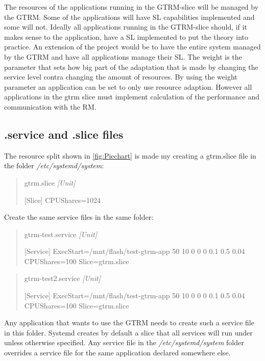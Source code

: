 \documentclass[nobiblatex]{LTHthesis}
\begin{document}
The resources of the applications running in the GTRM-slice will be managed by the GTRM. Some of the applications will have SL capabilities implemented and some will not. Ideally all applications running in the GTRM-slice should, if it makes sense to the application, have a SL implemented to put the theory into practice. An extension of the project would be to have the entire system managed by the GTRM and have all applications manage their SL. The weight is the parameter that sets how big part of the adaptation that is made by changing the service level contra changing the amount of resources. By using the weight parameter an application can be set to only use resource adaption. However all applications in the gtrm slice must implement calculation of the performance and communication with the RM.


\subsection{.service and .slice files}
The resource split shown in \ref{fig:Piechart} is made my creating a gtrm.slice file in the folder \emph{/etc/systemd/system}:
\begin{quotation}
gtrm.slice
\em
[Unit]

[Slice]
CPUShares=1024
\end{quotation}


Create the same service files in the same folder:
\begin{quotation}
gtrm-test.service
\em
[Unit]

[Service]
ExecStart=/mnt/flash/test-gtrm-app 50 10 0 0 0 0.1 0.5 0.04\newline
CPUShares=100
Slice=gtrm.slice
\end{quotation}

\begin{quotation}
gtrm-test2.service
\em
[Unit]

[Service]
ExecStart=/mnt/flash/test-gtrm-app 50 10 0 0 0 0.1 0.5 0.04\newline
CPUShares=100
Slice=gtrm.slice
\end{quotation}

Any application that wants to use the GTRM needs to create such a service file in this folder.
Systemd creates by default a slice that all services will run under unless otherwise specified. Any service file in the \emph{/etc/systemd/system} folder overrides a service file for the 
same application declared somewhere else.
\end{document}
